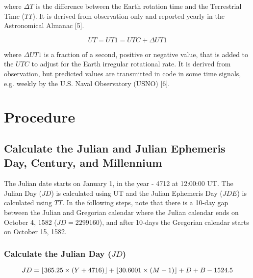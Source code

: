 \documentclass{article}
\DeclarePairedDelimiter\floor{\lfloor}{\rfloor}
\begin{document}
\par where $\Delta T$ is the difference between the Earth rotation time and
the Terrestrial Time ($TT$). It is derived from observation only and
reported yearly in the Astronomical Almanac [5].

\begin{equation}
  \label{eq:ut1}
  UT = UT1 = UTC + \Delta UT1
\end{equation}

\par where $\Delta UT1$ is a fraction of a second, positive or negative value,
that is added to the $UTC$ to adjust for the Earth irregular
rotational rate. It is derived from observation, but predicted values
are transmitted in code in some time signals, e.g. weekly by the
U.S. Naval Observatory (USNO) [6].

\section{Procedure}

\subsection{Calculate the Julian and Julian Ephemeris Day, Century,
  and Millennium}

\par The Julian date starts on January 1, in the year - 4712 at 12:00:00
UT. The Julian Day ($JD$) is calculated using UT and the Julian
Ephemeris Day ($JDE$) is calculated using $TT$. In the following
steps, note that there is a 10-day gap between the Julian and
Gregorian calendar where the Julian calendar ends on October 4, 1582
($JD = 2299160$), and after 10-days the Gregorian calendar starts on
October 15, 1582.

\subsubsection{Calculate the Julian Day ($JD$)}

\begin{equation}
  \label{eq:jd}
  JD = \floor{365.25 \times (Y + 4716)} + \floor{30.6001 \times (M + 1)} + D + B - 1524.5
\end{equation}
\end{document}
